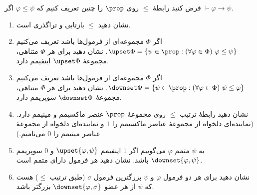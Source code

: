 فرض کنید رابطهٔ
$\leq$
روی
$\prop$
را چنین تعریف کنیم که
$\varphi\leq\psi$
اگر
$\vdash\varphi\to\psi$.
\begin{enumerate}[label=(\alph*)]
    \item 
    نشان دهید
    $\leq$
    بازتابی و تراگذری است.%
    \item اگر
    $\Phi$
    مجموعه‌ای از فرمول‌ها باشد تعریف می‌کنیم
    $\upset\Phi=\{\psi\in\prop : (\forall\varphi\in\Phi)\ \varphi\leq\psi\}$.
    نشان دهید برای هر
    $\Phi$
    متناهی، مجموعهٔ
    $\upset\Phi$
    اینفیمم دارد.
    \item اگر
    $\Phi$
    مجموعه‌ای از فرمول‌ها باشد تعریف می‌کنیم
    $\downset\Phi=\{\psi\in\prop : (\forall\varphi\in\Phi)\ \psi\leq\varphi\}$.
    نشان دهید برای هر
    $\Phi$
    متناهی، مجموعهٔ
    $\downset\Phi$
    سوپریمم دارد.
    \item نشان دهید رابطهٔ ترتیب
    $\leq$
    روی مجموعهٔ
    $\prop$
    عنصر ماکسیمم و مینیمم دارد.
    (نماینده‌ای دلخواه از مجموعهٔ عناصر ماکسیمم را $1$ و نماینده‌ای دلخواه از مجموعهٔ عناصر مینیمم را $0$ می‌نامیم.)
    \item به
    $\psi$
    متمم
    $\varphi$
    می‌گوییم اگر
    $1$
    اینفیمم
    $\upset\{\varphi,\psi\}$
    و
    $0$
    سوپریمم
    $\downset\{\varphi,\psi\}$
    باشد. نشان دهید هر فرمول دارای متمم است.
    \item نشان دهید برای هر دو فرمول
    $\varphi$
    و
    $\psi$
    بزرگترین فرمول
    $\sigma$
    (طبق ترتیب $\leq$)
    هست که
    $\psi$
    از هر عضو
    $\downset\{\varphi,\sigma\}$
    بزرگتر باشد.
\end{enumerate}\quad\vspace{-9mm}
